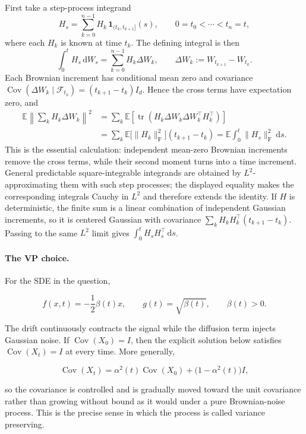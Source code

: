 \documentclass[11pt,a4paper]{article}
\theoremstyle{definition}
\begin{document}
\begin{proofsketch}
First take a step-process integrand
\[
H_s=\sum_{k=0}^{n-1}H_k\,\mathbf{1}_{(t_k,t_{k+1}]}(s),
\qquad
0=t_0<\cdots<t_n=t,
\]
where each $H_k$ is known at time $t_k$. The defining integral is then
\[
\int_0^tH_s\,\mathrm{d}W_s
=\sum_{k=0}^{n-1}H_k\Delta W_k,
\qquad
\Delta W_k:=W_{t_{k+1}}-W_{t_k}.
\]
Each Brownian increment has conditional mean zero and covariance
$\operatorname{Cov}(\Delta W_k\mid\mathcal{F}_{t_k})=(t_{k+1}-t_k)I_d$. Hence the
cross terms have expectation zero, and
\[
\begin{aligned}
\mathbb{E}\left\|\sum_kH_k\Delta W_k\right\|^2
&=\sum_k\mathbb{E}\!\left[
\operatorname{tr}\!\left(H_k\Delta W_k\Delta W_k^\top H_k^\top\right)\right] \\
&=\sum_k\mathbb{E}\bigl[\lVert H_k\rVert_{\mathrm{F}}^2\bigr]
(t_{k+1}-t_k)
=\mathbb{E}\int_0^t\lVert H_s\rVert_{\mathrm{F}}^2\,\mathrm{d}s.
\end{aligned}
\]
This is the essential calculation: independent mean-zero Brownian increments remove the
cross terms, while their second moment turns into a time increment. General predictable
square-integrable integrands are obtained by $L^2$-approximating them with such step
processes; the displayed equality makes the corresponding integrals Cauchy in $L^2$ and
therefore extends the identity. If $H$ is deterministic, the finite sum is a linear
combination of independent Gaussian increments, so it is centered Gaussian with covariance
$\sum_kH_kH_k^\top(t_{k+1}-t_k)$. Passing to the same $L^2$ limit gives
$\int_0^tH_sH_s^\top\,\mathrm{d}s$.
\end{proofsketch}

\paragraph{The VP choice.}
For the SDE in the question,

\[
f(x,t)=-\frac12\beta(t)x,
\qquad
g(t)=\sqrt{\beta(t)},
\qquad
\beta(t)>0.
\]

The drift continuously contracts the signal while the diffusion term injects Gaussian
noise. If $\operatorname{Cov}(X_0)=I$, then the explicit solution below satisfies
$\operatorname{Cov}(X_t)=I$ at every time. More generally,

\[
\operatorname{Cov}(X_t)
=\alpha^2(t)\operatorname{Cov}(X_0)
+\bigl(1-\alpha^2(t)\bigr)I,
\]

so the covariance is controlled and is gradually moved toward the unit covariance rather
than growing without bound as it would under a pure Brownian-noise process. This is the
precise sense in which the process is called variance preserving.
\end{document}
